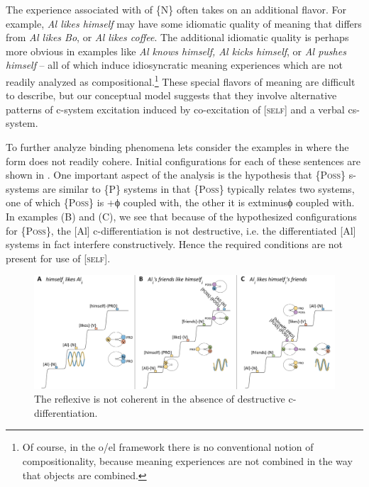   The  experience associated with  of \{N\} often takes on an additional flavor. For example, \textit{Al likes himself} may have some idiomatic quality of meaning that differs from \textit{Al likes Bo}, or \textit{Al likes coffee}. The additional idiomatic quality is perhaps more obvious in examples like \textit{Al knows himself, Al kicks himself}, or \textit{Al pushes himself} -- all of which induce idiosyncratic meaning experiences which are not readily analyzed as compositional.\footnote{Of course, in the o/el framework there is no conventional notion of compositionality, because meaning experiences are not combined in the way that objects are combined.} These special flavors of meaning are difficult to describe, but our conceptual model suggests that they involve alternative patterns of c-system excitation induced by co-excitation of  [\textsc{self}] and a verbal cs-system.

  To further analyze binding phenomena lets consider the examples in \linebreak where the  form does not readily cohere. Initial configurations for each of these sentences are shown in {}. One important aspect of the analysis is the hypothesis that \{P\textsc{oss}\} s-systems are similar to \{P\} systems in that \{P\textsc{oss}\} typically relates two systems, one of which \{P\textsc{oss}\} is +ϕ coupled with, the other it is 	extminus{}ϕ coupled with. In examples (B) and (C), we see that because of the hypothesized configurations for \{P\textsc{oss}\}, the [Al] c-dif\-fer\-en\-ti\-a\-tion is not destructive, i.e. the differentiated [Al] systems in fact interfere constructively. Hence the required conditions are not present for use of [\textsc{self}]. 

\ea\label{ex:7:16}
\z
\z

\begin{figure}
\includegraphics[width=\textwidth]{figures/Tilsen-img157.png}
\caption{The reflexive is not coherent in the absence of destructive c-dif\-fer\-en\-ti\-a\-tion.}
\label{fig:7:13}
\end{figure}
 

